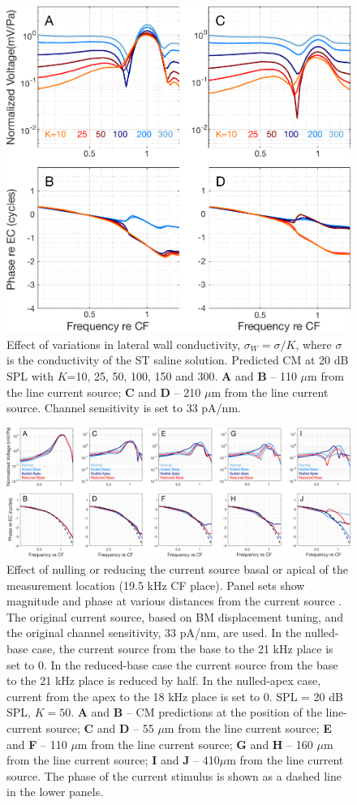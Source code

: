 \documentclass{biophys-new}
\begin{document}
\begin{figure}[h]
\centering
\includegraphics[width = 10 cm]{final_figures/k.pdf}
\caption{Effect of variations in lateral wall conductivity, $\sigma_W = \sigma/K$, where $\sigma$ is the conductivity of the ST saline solution.  Predicted CM at 20 dB SPL with $K$=10, 25, 50, 100, 150 and 300. \textbf{A} and \textbf{B} -- 110 $\mu$m from the line current source; \textbf{C} and \textbf{D} -- 210 $\mu$m from the line current source. Channel sensitivity is set to 33 pA/nm.}
\label{K}
\end{figure}

\begin{figure}[h]
\centering
\includegraphics[width = \textwidth]{final_figures/Modified Damage Figure.pdf}
\caption{Effect of nulling or reducing the current source basal or apical of the measurement location (19.5 kHz CF place). Panel sets show magnitude and phase at various distances from the current source . The original current source, based on BM displacement tuning, and the original channel sensitivity, 33 pA/nm, are used. In the nulled-base case, the current source from the base to the 21 kHz place is set to 0. In the reduced-base case the current source from the base to the 21 kHz place is reduced by half. In the nulled-apex case, current from the apex to the 18 kHz place is set to 0. SPL = 20 dB SPL, $K=50$. \textbf{A} and \textbf{B} -- CM predictions at the position of the line-current source; \textbf{C} and \textbf{D} -- 55 $\mu$m from the line current source; \textbf{E} and \textbf{F} -- 110 $\mu$m from the line current source; \textbf{G} and \textbf{H} -- 160 $\mu$m from the line current source; \textbf{I} and \textbf{J} -- 410$\mu$m from the line current source.  The phase of the current stimulus is shown as a dashed line in the lower panels.}
\label{damage}
\end{figure}
\end{document}
